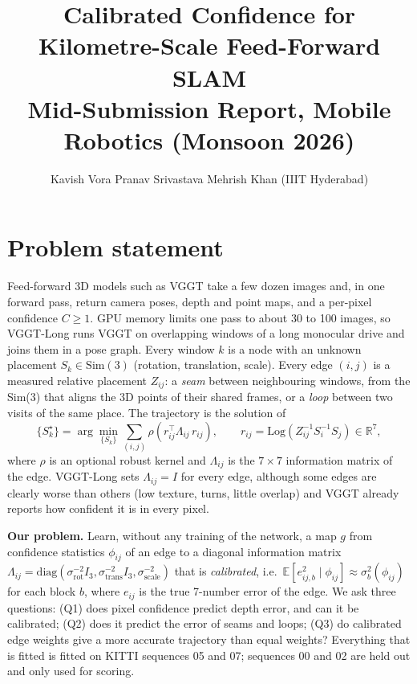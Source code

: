 \documentclass[11pt, a4paper]{article}
\title{\vspace{-1.2cm}\textbf{Calibrated Confidence for Kilometre-Scale Feed-Forward SLAM}\\[2pt]
\large Mid-Submission Report, Mobile Robotics (Monsoon 2026)}
\author{Kavish Vora \quad Pranav Srivastava \quad Mehrish Khan \quad (IIIT Hyderabad)}
\date{}
\begin{document}
\maketitle
\vspace{-1.0cm}

\section{Problem statement}

Feed-forward 3D models such as VGGT \cite{vggt} take a few dozen images and, in one forward pass, return camera poses,
depth and point maps, and a per-pixel confidence $C \ge 1$. GPU memory limits one pass to about 30 to 100 images, so
VGGT-Long \cite{vggtlong} runs VGGT on overlapping windows of a long monocular drive and joins them in a pose graph.
Every window $k$ is a node with an unknown placement $S_k \in \mathrm{Sim}(3)$ (rotation, translation, scale). Every
edge $(i,j)$ is a measured relative placement $Z_{ij}$: a \emph{seam} between neighbouring windows, from the Sim(3) that
aligns the 3D points of their shared frames, or a \emph{loop} between two visits of the same place. The trajectory is
the solution of
\begin{equation}
  \{S_k^\star\} = \arg\min_{\{S_k\}} \sum_{(i,j)} \rho\!\left(r_{ij}^\top \Lambda_{ij}\, r_{ij}\right),\qquad
  r_{ij} = \mathrm{Log}\!\left(Z_{ij}^{-1} S_i^{-1} S_j\right) \in \mathbb{R}^7,
\end{equation}
where $\rho$ is an optional robust kernel and $\Lambda_{ij}$ is the $7\times7$ information matrix of the edge. VGGT-Long
sets $\Lambda_{ij} = I$ for every edge, although some edges are clearly worse than others (low texture, turns,
little overlap) and VGGT already reports how confident it is in every pixel.

\textbf{Our problem.} Learn, without any training of the network, a map $g$ from confidence statistics $\phi_{ij}$ of an
edge to a diagonal information matrix $\Lambda_{ij} = \mathrm{diag}(\sigma_{\mathrm{rot}}^{-2} I_3,
\sigma_{\mathrm{trans}}^{-2} I_3, \sigma_{\mathrm{scale}}^{-2})$ that is \emph{calibrated}, i.e.\
$\mathbb{E}[e_{ij,b}^2 \mid \phi_{ij}] \approx \sigma_b^2(\phi_{ij})$ for each block $b$, where $e_{ij}$ is the true
7-number error of the edge. We ask three questions:
(Q1) does pixel confidence predict depth error, and can it be calibrated; (Q2) does it predict the error of seams and
loops; (Q3) do calibrated edge weights give a more accurate trajectory than equal weights? Everything that is fitted is
fitted on KITTI \cite{kitti} sequences 05 and 07; sequences 00 and 02 are held out and only used for scoring.
\end{document}
